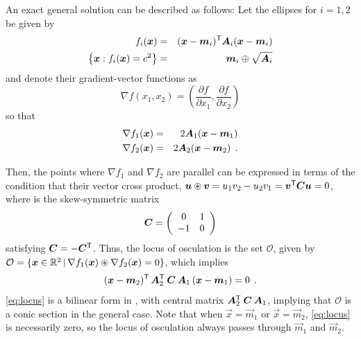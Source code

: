 An exact general solution can be described as follows:  Let the ellipses for $i=1, 2$ be given by
\begin{eqnarray*}
f_i(\bm{x}) & = & (\bm{x}-\bm{m}_i)^\mathsf{T} \bm{A}_i (\bm{x}-\bm{m}_i) \\
\left\{ \bm{x}: f_i(\bm{x}) = c^2 \right\} & = &\bm{m}_i \oplus \sqrt{\bm{A}_i}
\end{eqnarray*}
and denote their gradient-vector functions as
\begin{equation}
\nabla f(x_1, x_2) = \left(\frac{\partial f}{\partial x_1}, \frac{\partial f}{\partial x_2} \right)
\end{equation}
so that
\begin{eqnarray*}
\nabla f_1(\bm{x}) & = & 2 \bm{A}_1 (\bm{x}-\bm{m}_1) \\
\nabla f_2(\bm{x}) & = & 2 \bm{A}_2 (\bm{x}-\bm{m}_2) \:\: . \\
\end{eqnarray*}

Then, the points where $\nabla f_1$ and $\nabla f_2$ are parallel can be expressed in terms of the
condition that their vector cross product,
$\bm{u} \circledast \bm{v} = u_1 v_2 - u_2 v_1 = \bm{v}^\mathsf{T} \bm{C} \bm{u} = 0$, where  is the skew-symmetric matrix
\begin{equation*}
\bm{C} = \left(
\begin{array}{cc}
 0 & 1 \\ -1 & 0
\end{array}
\right)
\end{equation*}
satisfying $\bm{C} = -\bm{C}^\mathsf{T}$.
Thus, the locus of osculation is the set $\mathcal{O}$, given by $\mathcal{O}  = \{\bm{x} \in \mathbb{R}^{2} \, | \, \nabla f_1(\bm{x}) \circledast \nabla f_2(\bm{x}) = 0 \}$,
which implies
\begin{equation}
(\bm{x}-\bm{m}_2)^\mathsf{T} \, \bm{A}_2 ^\mathsf{T} \: \bm{C} \: \bm{A}_1 \, (\bm{x}-\bm{m}_1) = 0  \:\: .  \label{eq:locus}
\end{equation}
\eqref{eq:locus} is a bilinear form in , with central matrix $\bm{A}_2 ^\mathsf{T} \: \bm{C} \: \bm{A}_1$,
implying that $\mathcal{O}$ is a conic section in the general case. Note that when $\vec{x}=\vec{m}_1$ or $\vec{x}=\vec{m}_2$,
\eqref{eq:locus} is necessarily zero, so the locus of osculation always passes through  $\vec{m}_1$ and $\vec{m}_2$.

